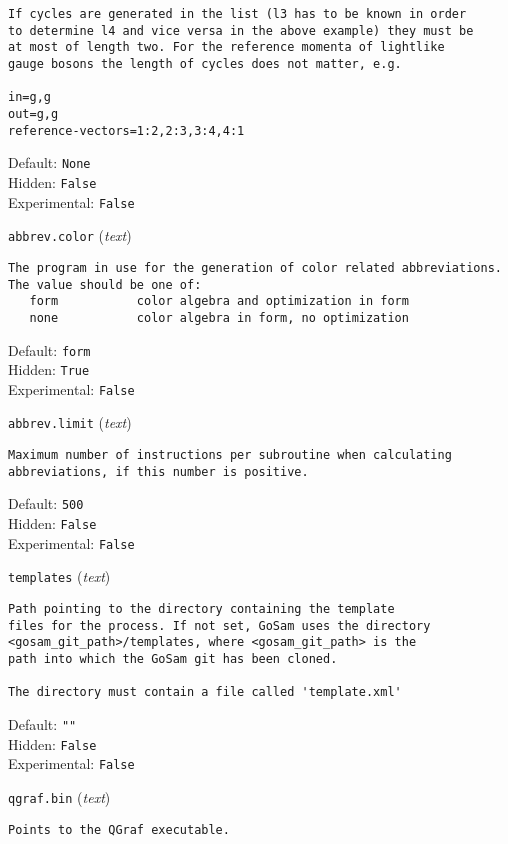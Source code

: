 \begin{basedescript}{\desclabelstyle{\pushlabel}}
\begin{verbatim}
If cycles are generated in the list (l3 has to be known in order
to determine l4 and vice versa in the above example) they must be
at most of length two. For the reference momenta of lightlike
gauge bosons the length of cycles does not matter, e.g.

in=g,g
out=g,g
reference-vectors=1:2,2:3,3:4,4:1
\end{verbatim}
Default: \verb|None|
\\Hidden: \verb|False|
\\Experimental: \verb|False|
\\\item[\colorbox{gray!30}{\texttt{abbrev.color}}] (\textit{text})
\begin{verbatim}
The program in use for the generation of color related abbreviations.
The value should be one of:
   form           color algebra and optimization in form
   none           color algebra in form, no optimization
\end{verbatim}
Default: \verb|form|
\\Hidden: \verb|True|
\\Experimental: \verb|False|
\\\item[\colorbox{gray!30}{\texttt{abbrev.limit}}] (\textit{text})
\begin{verbatim}
Maximum number of instructions per subroutine when calculating
abbreviations, if this number is positive.
\end{verbatim}
Default: \verb|500|
\\Hidden: \verb|False|
\\Experimental: \verb|False|
\\\item[\colorbox{gray!30}{\texttt{templates}}] (\textit{text})
\begin{verbatim}
Path pointing to the directory containing the template
files for the process. If not set, GoSam uses the directory
<gosam_git_path>/templates, where <gosam_git_path> is the
path into which the GoSam git has been cloned.

The directory must contain a file called 'template.xml'
\end{verbatim}
Default: \verb|""|
\\Hidden: \verb|False|
\\Experimental: \verb|False|
\\\item[\colorbox{gray!30}{\texttt{qgraf.bin}}] (\textit{text})
\begin{verbatim}
Points to the QGraf executable.


\end{verbatim}
\end{basedescript}
